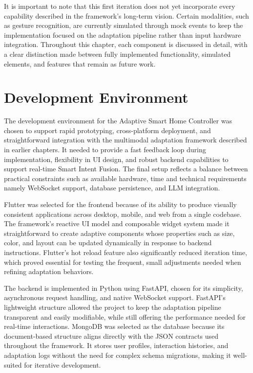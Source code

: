 It is important to note that this first iteration does not yet incorporate every capability described in the framework’s long-term vision. Certain modalities, such as gesture recognition, are currently simulated through mock events to keep the implementation focused on the adaptation pipeline rather than input hardware integration. Throughout this chapter, each component is discussed in detail, with a clear distinction made between fully implemented functionality, simulated elements, and features that remain as future work.

\section{Development Environment}
The development environment for the Adaptive Smart Home Controller was chosen to support rapid prototyping, cross-platform deployment, and straightforward integration with the multimodal adaptation framework described in earlier chapters. It needed to provide a fast feedback loop during implementation, flexibility in UI design, and robust backend capabilities to support real-time Smart Intent Fusion. The final setup reflects a balance between practical constraints such as available hardware, time and technical requirements namely WebSocket support, database persistence, and LLM integration.

Flutter was selected for the frontend because of its ability to produce visually consistent applications across desktop, mobile, and web from a single codebase. The framework’s reactive UI model and composable widget system made it straightforward to create adaptive components whose properties such as size, color, and layout can be updated dynamically in response to backend instructions. Flutter’s hot reload feature also significantly reduced iteration time, which proved essential for testing the frequent, small adjustments needed when refining adaptation behaviors.

The backend is implemented in Python using FastAPI, chosen for its simplicity, asynchronous request handling, and native WebSocket support. FastAPI’s lightweight structure allowed the project to keep the adaptation pipeline transparent and easily modifiable, while still offering the performance needed for real-time interactions. MongoDB was selected as the database because its document-based structure aligns directly with the JSON contracts used throughout the framework. It stores user profiles, interaction histories, and adaptation logs without the need for complex schema migrations, making it well-suited for iterative development.

